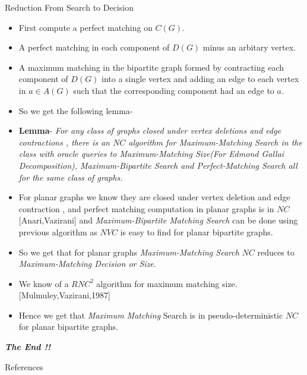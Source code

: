 \documentclass{beamer}
\begin{document}
\begin{frame}[allowframebreaks]{Reduction From Search to Decision}
\begin{itemize}
		\item First compute a perfect matching on $C(G)$.
		\item A perfect matching in each component of $D(G)$ minus an arbitary vertex.
		\item A maximum matching in the bipartite graph formed by contracting each component of $D(G)$ into a single vertex and adding an edge to each vertex in $a\in A(G)$ such that the corresponding  component had an edge to $a$.
		\item So we get the following lemma-
		\item \textbf{Lemma}- \textit{For any class of graphs closed under vertex deletions and edge contractions , there is an $NC$ algorithm for \textit{Maximum-Matching Search} in the class with oracle queries to \textit{Maximum-Matching Size}(For Edmond Gallai Decomposition), Maximum-Bipartite Search and Perfect-Matching Search all for the same class of graphs.}
		\item For planar graphs we know they are closed under vertex deletion and edge contraction , and perfect matching computation in planar graphs is in $NC$[Anari,Vazirani] and \textit{Maximum-Bipartite Matching Search} can be done using previous algorithm as $NVC $ is easy to find for planar bipartite graphs.
		\item So we get that for  planar graphs \textit{Maximum-Matching Search} $NC$ reduces to \textit{Maximum-Matching Decision or Size}.
		\item We know of a $RNC^2$ algorithm for maximum matching size.[Mulmuley,Vazirani,1987]
		\item Hence we get  that \textit{Maximum Matching} Search is in pseudo-deterministic  $NC$ for planar bipartite graphs.
	\end{itemize}


\end{frame}
	\begin{frame}
		\centering \Huge
		\textbf{\emph{The End   !! }}
		
	\end{frame}
	
	\begin{frame}[allowframebreaks]{References}
		
		\printbibliography[heading=none]
			
	\end{frame}
	
\end{document}
